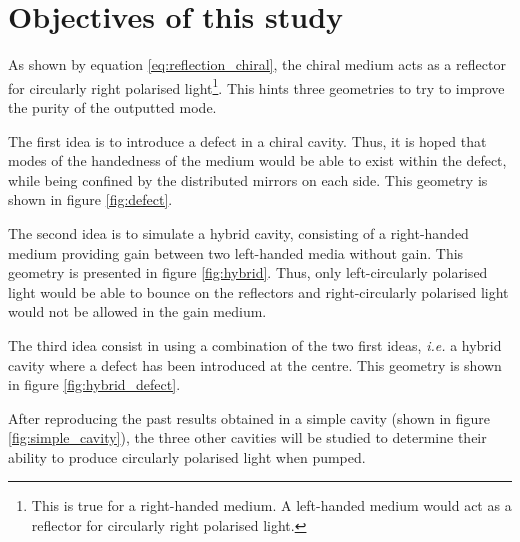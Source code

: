 \section{Objectives of this study}
As shown by equation \ref{eq:reflection_chiral}, the chiral medium acts as a reflector for circularly right polarised light\footnote{This is true for a right-handed medium. A left-handed medium would act as a reflector for circularly right polarised light.}. This hints three geometries to try to improve the purity of the outputted mode. 

The first idea is to introduce a defect in a chiral cavity. Thus, it is hoped that modes of the handedness of the medium would be able to exist within the defect, while being confined by the distributed mirrors on each side. This geometry is shown in figure \ref{fig:defect}.

The second idea is to simulate a hybrid cavity, consisting of a right-handed medium providing gain between two left-handed media without gain. This geometry is presented in figure \ref{fig:hybrid}. Thus, only left-circularly polarised light would be able to bounce on the reflectors and right-circularly polarised light would not be allowed in the gain medium.

The third idea consist in using a combination of the two first ideas, \textit{i.e.} a hybrid cavity where a defect has been introduced at the centre. This geometry is shown in figure \ref{fig:hybrid_defect}.

After reproducing the past results obtained in a simple cavity (shown in figure \ref{fig:simple_cavity}), the three other cavities will be studied to determine their ability to produce circularly polarised light when pumped.


